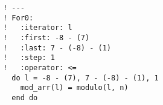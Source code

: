 \begin{lstlisting}[language={[90]Fortran},basicstyle=\footnotesize\sffamily]
! ---
! For0:
!   :iterator: l
!   :first: -8 - (7)
!   :last: 7 - (-8) - (1)
!   :step: 1
!   :operator: <=
  do l = -8 - (7), 7 - (-8) - (1), 1
    mod_arr(l) = modulo(l, n)
  end do
\end{lstlisting}
